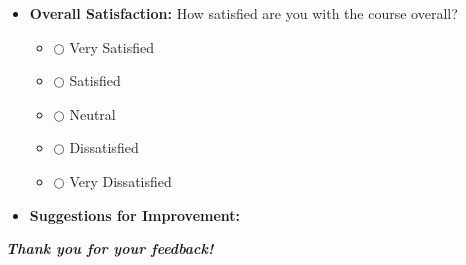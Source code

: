 \documentclass[a4paper,12pt]{article}
\begin{document}
\begin{itemize}
    \item \textbf{Overall Satisfaction:} How satisfied are you with the course overall?
    \begin{itemize}
        \item[] $\bigcirc$ Very Satisfied
        \item[] $\bigcirc$ Satisfied
        \item[] $\bigcirc$ Neutral
        \item[] $\bigcirc$ Dissatisfied
        \item[] $\bigcirc$ Very Dissatisfied
    \end{itemize}

    \item \textbf{Suggestions for Improvement:} \\
    \hrulefill
    \vfill
\end{itemize}

\begin{flushright}\textbf{\textit{Thank you for your feedback!}}\end{flushright}
\end{document}
